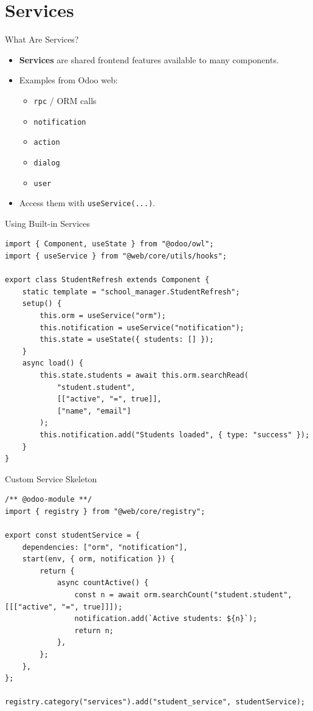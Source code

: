 \section{Services}

\begin{frame}{What Are Services?}
	\begin{itemize}
		\item \textbf{Services} are shared frontend features available to many components.
		\item Examples from Odoo web:
		\begin{itemize}
			\item \texttt{rpc} / ORM calls
			\item \texttt{notification}
			\item \texttt{action}
			\item \texttt{dialog}
			\item \texttt{user}
		\end{itemize}
		\item Access them with \texttt{useService(...)}.
	\end{itemize}
\end{frame}

\begin{frame}[fragile]{Using Built-in Services}
\begin{lstlisting}[style=js]
import { Component, useState } from "@odoo/owl";
import { useService } from "@web/core/utils/hooks";

export class StudentRefresh extends Component {
	static template = "school_manager.StudentRefresh";
	setup() {
		this.orm = useService("orm");
		this.notification = useService("notification");
		this.state = useState({ students: [] });
	}
	async load() {
		this.state.students = await this.orm.searchRead(
			"student.student",
			[["active", "=", true]],
			["name", "email"]
		);
		this.notification.add("Students loaded", { type: "success" });
	}
}
\end{lstlisting}
\end{frame}

\begin{frame}[fragile]{Custom Service Skeleton}
\begin{lstlisting}[style=js]
/** @odoo-module **/
import { registry } from "@web/core/registry";

export const studentService = {
	dependencies: ["orm", "notification"],
	start(env, { orm, notification }) {
		return {
			async countActive() {
				const n = await orm.searchCount("student.student", [[["active", "=", true]]]);
				notification.add(`Active students: ${n}`);
				return n;
			},
		};
	},
};

registry.category("services").add("student_service", studentService);
\end{lstlisting}
\end{frame}

